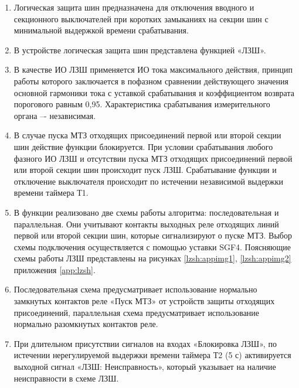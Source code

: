
\color{black}

\begin{enumerate}

\item
Логическая защита шин предназначена для отключения вводного и секционного выключателей при коротких замыканиях на секции шин с минимальной выдержкой времени срабатывания. 

\item
В устройстве логическая защита шин представлена функцией «ЛЗШ». 

\item
В  качестве  ИО  ЛЗШ  применяется  ИО  тока  максимального  действия,  принцип  работы  которого заключается в пофазном сравнении действующего значения основной гармоники тока с уставкой срабатывания и коэффициентом возврата порогового равным 0,95. Характеристика срабатывания измерительного органа –- независимая.

\item
В  случае  пуска  МТЗ  отходящих  присоединений  первой или второй секции шин действие функции блокируется. При  условии  срабатывания  любого  фазного  ИО  ЛЗШ  и  отсутствии  пуска  МТЗ  отходящих присоединений первой или второй секции шин происходит пуск ЛЗШ. Срабатывание  функции  и  отключение выключателя происходит по истечении независимой выдержки времени таймера Т1. 

\item
В функции реализовано две схемы работы алгоритма: последовательная и параллельная. Они учитывают контакты выходных реле отходящих линий первой или второй секции шин, которые сигнализируют о пуске  МТЗ. Выбор схемы подключения осуществляется с помощью  уставки  SGF4. Поясняющие схемы работы ЛЗШ представлены на рисунках \ref{lzsh:appimg1}, \ref{lzsh:appimg2} приложения \ref{app:lzsh}. 

\item
Последовательная  схема  предусматривает  использование  нормально  замкнутых  контактов  реле «Пуск  МТЗ» от устройств защиты отходящих присоединений, параллельная схема предусматривает использование нормально разомкнутых контактов реле.

\item
При длительном присутствии сигналов на входах «Блокировка ЛЗШ», по истечении нерегулируемой выдержки времени таймера Т2 (5 с) активируется выходной сигнал «ЛЗШ: Неисправность», который указывает на наличие неисправности в схеме ЛЗШ.


\end{enumerate}
